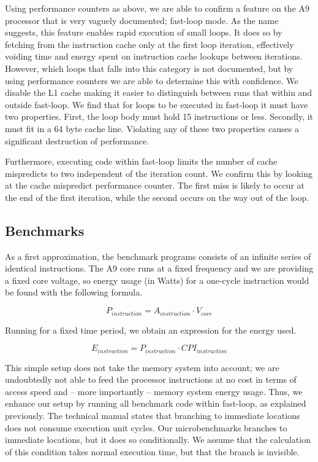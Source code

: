 Using performance counters as above, we are able to confirm a feature on the A9
processor that is very vaguely documented; fast-loop\texttrademark{} mode. As
the name suggests, this feature enables rapid execution of small loops. It does
so by fetching from the instruction cache only at the first loop iteration,
effectively voiding time and energy spent on instruction cache lookups between
iterations. However, which loops that falls into this category is not
documented, but by using performance counters we are able to determine this with
confidence. We disable the L1 cache making it easier to distinguish between runs
that within and outside fast-loop. We find that for loops to be executed in
fast-loop it must have two properties. First, the loop body must hold 15
instructions or less. Secondly, it must fit in a 64 byte cache line. Violating
any of these two properties causes a significant destruction of performance.

Furthermore, executing code within fast-loop limits the number of cache
mispredicts to two independent of the iteration count. We confirm this by
looking at the cache mispredict performance counter. The first miss is likely to
occur at the end of the first iteration, while the second occurs on the way out
of the loop.

\subsection{Benchmarks}
As a first approximation, the benchmark programs consists of an infinite series
of identical instructions. The A9 core runs at a fixed frequency and we are
providing a fixed core voltage, so energy usage (in Watts) for a one-cycle
instruction would be found with the following formula.

\begin{equation}
    P_{instruction} = A_{instruction} \cdot V_{core}
\end{equation}

Running for a fixed time period, we obtain an expression for the energy used.

\begin{equation}
    E_{instruction} = P_{instruction} \cdot CPI_{instruction}
\end{equation}

This simple setup does not take the memory system into account; we are
undoubtedly not able to feed the processor instructions at no cost in terms of
access speed and -- more importantly -- memory system energy usage. Thus, we
enhance our setup by running all benchmark code within fast-loop, as explained
previously. The technical manual states that branching to immediate locations
does not consume execution unit cycles. Our microbenchmarks branches to
immediate locations, but it does so conditionally. We assume that the
calculation of this condition takes normal execution time, but that the branch
is invisible.

